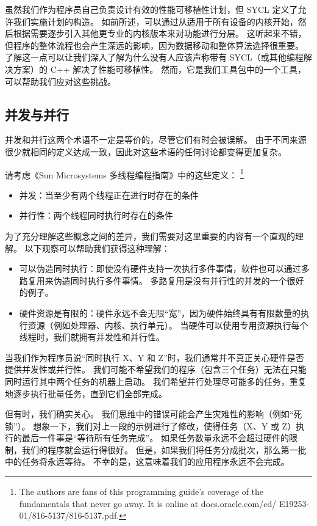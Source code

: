 虽然我们作为程序员自己负责设计有效的性能可移植性计划，但 SYCL 定义了允许我们实施计划的构造。 
如前所述，可以通过从适用于所有设备的内核开始，然后根据需要逐步引入其他更专业的内核版本来对功能进行分层。 
这听起来不错，但程序的整体流程也会产生深远的影响，因为数据移动和整体算法选择很重要。 
了解这一点可以让我们深入了解为什么没有人应该声称带有 SYCL（或其他编程解决方案）的 C++ 解决了性能可移植性。 
然而，它是我们工具包中的一个工具，可以帮助我们应对这些挑战。


\subsection{并发与并行}
并发和并行这两个术语不一定是等价的，尽管它们有时会被误解。 
由于不同来源很少就相同的定义达成一致，因此对这些术语的任何讨论都变得更加复杂。

请考虑《Sun Microsystems 多线程编程指南》中的这些定义：
\footnote{The authors are fans of this programming guide’s coverage of the fundamentals that never go away. It is online at docs.oracle.com/cd/ E19253-01/816-5137/816-5137.pdf.}

\begin{itemize}
	\item 并发：当至少有两个线程正在进行时存在的条件

	\item 并行性：两个线程同时执行时存在的条件
\end{itemize}

为了充分理解这些概念之间的差异，我们需要对这里重要的内容有一个直观的理解。 
以下观察可以帮助我们获得这种理解：

\begin{itemize}
	\item 可以伪造同时执行：即使没有硬件支持一次执行多件事情，软件也可以通过多路复用来伪造同时执行多件事情。 
		多路复用是没有并行性的并发的一个很好的例子。

	\item 硬件资源是有限的：硬件永远不会无限“宽”，因为硬件始终具有有限数量的执行资源（例如处理器、内核、执行单元）。 
	当硬件可以使用专用资源执行每个线程时，我们就拥有并发性和并行性。
\end{itemize}

当我们作为程序员说“同时执行 X、Y 和 Z”时，我们通常并不真正关心硬件是否提供并发性或并行性。 
我们可能不希望我们的程序（包含三个任务）无法在只能同时运行其中两个任务的机器上启动。 
我们希望并行处理尽可能多的任务，重复地逐步执行批量任务，直到它们全部完成。

但有时，我们确实关心。 我们思维中的错误可能会产生灾难性的影响（例如“死锁”）。 
想象一下，我们对上一段的示例进行了修改，使得任务（X、Y 或 Z）执行的最后一件事是“等待所有任务完成”。 
如果任务数量永远不会超过硬件的限制，我们的程序就会运行得很好。 
但是，如果我们将任务分成批次，那么第一批中的任务将永远等待。 不幸的是，这意味着我们的应用程序永远不会完成。


